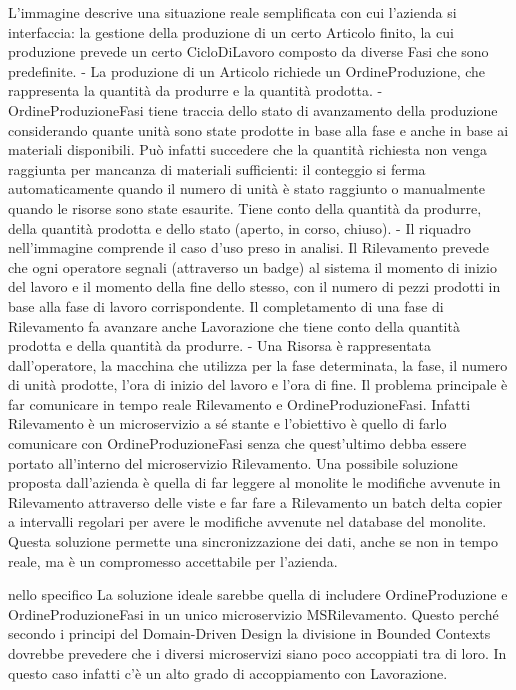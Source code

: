         L'immagine descrive una situazione reale semplificata con cui l'azienda si interfaccia: la gestione della produzione di un certo Articolo finito, la cui produzione prevede un certo CicloDiLavoro composto da diverse Fasi che sono predefinite. 
        - La produzione di un Articolo richiede un OrdineProduzione, che rappresenta la quantità da produrre e la quantità prodotta.
        - OrdineProduzioneFasi tiene traccia dello stato di avanzamento della produzione considerando quante unità sono state prodotte in base alla fase e anche in base ai materiali disponibili. Può infatti succedere che la quantità richiesta non venga raggiunta per mancanza di materiali sufficienti: il conteggio si ferma automaticamente quando il numero di unità è stato raggiunto o manualmente quando le risorse sono state esaurite. Tiene conto della quantità da produrre, della quantità prodotta e dello stato (aperto, in corso, chiuso).
        - Il riquadro nell'immagine comprende il caso d'uso preso in analisi. Il Rilevamento prevede che ogni operatore segnali (attraverso un badge) al sistema il momento di inizio del lavoro e il momento della fine dello stesso, con il numero di pezzi prodotti in base alla fase di lavoro corrispondente. Il completamento di una fase di Rilevamento fa avanzare anche Lavorazione che tiene conto della quantità prodotta e della quantità da produrre.
        - Una Risorsa è rappresentata dall'operatore, la macchina che utilizza per la fase determinata, la fase, il numero di unità prodotte, l'ora di inizio del lavoro e l'ora di fine.
        Il problema principale è far comunicare in tempo reale Rilevamento e OrdineProduzioneFasi. Infatti Rilevamento è un microservizio a sé stante e l'obiettivo è quello di farlo comunicare con OrdineProduzioneFasi senza che quest'ultimo debba essere portato all'interno del microservizio Rilevamento.
        Una possibile soluzione proposta dall'azienda è quella di far leggere al monolite le modifiche avvenute in Rilevamento attraverso delle viste e far fare a Rilevamento un batch delta copier a intervalli regolari per avere le modifiche avvenute nel database del monolite. Questa soluzione permette una sincronizzazione dei dati, anche se non in tempo reale, ma è un compromesso accettabile per l'azienda.

        

        nello specifico
        La soluzione ideale sarebbe quella di includere OrdineProduzione e OrdineProduzioneFasi in un unico microservizio MSRilevamento. Questo perché secondo i principi del Domain-Driven Design la divisione in Bounded Contexts dovrebbe prevedere che i diversi microservizi siano poco accoppiati tra di loro. In questo caso infatti c'è un alto grado di accoppiamento con Lavorazione.
        
